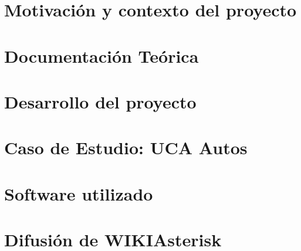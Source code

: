\documentclass[a4paper,11pt]{book}
\begin{document}
\renewcommand{\listfigurename}{Indice de figuras}
\renewcommand{\tablename}{Tabla}
\renewcommand{\listtablename}{Indice de tablas}


\pagestyle{empty}

\cleardoublepage


\cleardoublepage
\pagestyle{plain}

\frontmatter %


\cleardoublepage

\tableofcontents
\listoffigures
\listoftables

\mainmatter %

\chapter{Motivación y contexto del proyecto}

\chapter{Documentación Teórica}


\chapter{Desarrollo del proyecto}


\chapter{Caso de Estudio: UCA Autos}





\backmatter %

\clearpage

\chapter*{Software utilizado}


\chapter*{Difusión de WIKIAsterisk}\label{cap:difusion}




\nocite{atdg11}
\nocite{website:voipinfo}
\nocite{website:asterisk}
\nocite{win09}


\end{document}
